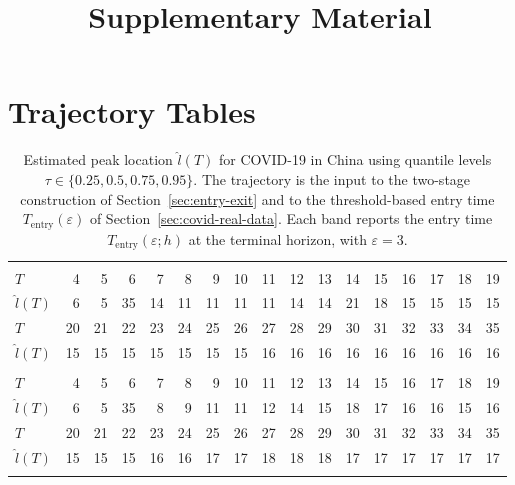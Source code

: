 \documentclass[12pt,a4paper]{article}
\title{\textbf{Supplementary Material}}
\author{}
\date{}
\begin{document}
	\maketitle
	\appendix
	
	\section{Trajectory Tables}
	\label{app:trajectories}
	
	\begin{table}
		\caption{Estimated peak location $\hat{l}(T)$ for COVID-19 in China using quantile levels $\tau\in\{0.25,0.5,0.75,0.95\}$. The trajectory is the input to the two-stage construction of Section~\ref{sec:entry-exit} and to the threshold-based entry time $T_{\mathrm{entry}}(\varepsilon)$ of Section~\ref{sec:covid-real-data}. Each band reports the entry time $T_{\mathrm{entry}}(\varepsilon;h)$ at the terminal horizon, with $\varepsilon=3$.}
		\label{tab:china_tau}
		\begin{tabular*}{\textheight}{@{\extracolsep{\fill}}lrrrrrrrrrrrrrrrr}
			\toprule
			\addlinespace[2.5pt]
			\multicolumn{17}{c}{\textbf{$\tau=0.25,\ T_{\mathrm{entry}}(3)=15$}} \\
			\addlinespace[2.5pt]
			\midrule
			$T$ & 4 & 5 & 6 & 7 & 8 & 9 & 10 & 11 & 12 & 13 & 14 & 15 & 16 & 17 & 18 & 19 \\
			$\hat{l}(T)$ & 6 & 5 & 35 & 14 & 11 & 11 & 11 & 11 & 14 & 14 & 21 & 18 & 15 & 15 & 15 & 15 \\
			$T$ & 20 & 21 & 22 & 23 & 24 & 25 & 26 & 27 & 28 & 29 & 30 & 31 & 32 & 33 & 34 & 35 \\
			$\hat{l}(T)$ & 15 & 15 & 15 & 15 & 15 & 15 & 15 & 16 & 16 & 16 & 16 & 16 & 16 & 16 & 16 & 16 \\
			\midrule\addlinespace[2.5pt]
			\multicolumn{17}{c}{\textbf{$\tau=0.5,\ T_{\mathrm{entry}}(3)=13$}} \\
			\addlinespace[2.5pt]
			\midrule
			$T$ & 4 & 5 & 6 & 7 & 8 & 9 & 10 & 11 & 12 & 13 & 14 & 15 & 16 & 17 & 18 & 19 \\
			$\hat{l}(T)$ & 6 & 5 & 35 & 8 & 9 & 11 & 11 & 12 & 14 & 15 & 18 & 17 & 16 & 16 & 15 & 16 \\
			$T$ & 20 & 21 & 22 & 23 & 24 & 25 & 26 & 27 & 28 & 29 & 30 & 31 & 32 & 33 & 34 & 35 \\
			$\hat{l}(T)$ & 15 & 15 & 15 & 16 & 16 & 17 & 17 & 18 & 18 & 18 & 17 & 17 & 17 & 17 & 17 & 17 \\
			\midrule\addlinespace[2.5pt]
			\multicolumn{17}{c}{\textbf{$\tau=0.75,\ T_{\mathrm{entry}}(3)=23$}} \\

\end{tabular*}
\end{table}
\end{document}
